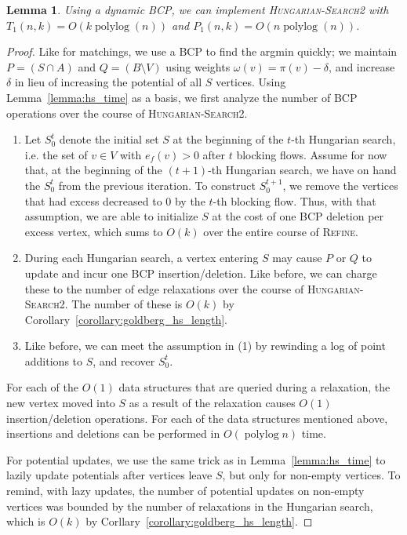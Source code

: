 \documentclass[11pt]{article}
\def\polylog{\mathop{\mathrm{polylog}}}
\theoremstyle{plain}
\newtheorem{lemma}{Lemma}[section]
\numberwithin{figure}{section}
\begin{document}
\begin{lemma}
\label{lemma:goldberg_hs_time}
Using a dynamic BCP, we can implement \textsc{Hungarian-Search2} with
$T_1(n, k) = O(k\polylog(n))$ and $P_1(n, k) = O(n\polylog(n))$.
\end{lemma}

\begin{proof}
Like for matchings, we use a BCP to find the argmin quickly; we maintain
$P = (S \cap A)$ and $Q = (B \setminus V)$ using weights
$\omega(v) = \pi(v) - \delta$, and increase $\delta$ in lieu of increasing the
potential of all $S$ vertices.
Using Lemma~\ref{lemma:hs_time} as a basis, we first analyze the number of BCP
operations over the course of \textsc{Hungarian-Search2}.
\begin{enumerate}
\item Let $S^t_0$ denote the initial set $S$ at the beginning of the
	$t$-th Hungarian search, i.e. the set of $v \in V$ with
	$e_f(v) > 0$ after $t$ blocking flows.
	Assume for now that, at the beginning of the $(t+1)$-th
	Hungarian search, we have on hand the $S^t_0$ from the
	previous iteration.
	To construct $S^{t+1}_0$, we remove the vertices that had
	excess decreased to 0 by the $t$-th blocking flow.
	Thus, with that assumption, we are able to initialize $S$ at
	the cost of one BCP deletion per excess vertex, which sums to
	$O(k)$ over the entire course of \textsc{Refine}.
\item During each Hungarian search, a vertex entering $S$ may cause $P$
	or $Q$ to update and incur one BCP insertion/deletion.
	Like before, we can charge these to the number of edge
	relaxations over the course of \textsc{Hungarian-Search2}.
	The number of these is $O(k)$ by
	Corollary~\ref{corollary:goldberg_hs_length}.
\item Like before, we can meet the assumption in (1) by rewinding a log
	of point additions to $S$, and recover $S^t_0$.
\end{enumerate}

For each of the $O(1)$ data structures that are queried during a relaxation,
the new vertex moved into $S$ as a result of the relaxation causes $O(1)$
insertion/deletion operations.
For each of the data structures mentioned above, insertions and deletions
can be performed in $O(\polylog n)$ time.

For potential updates, we use the same trick as in Lemma~\ref{lemma:hs_time} to
lazily update potentials after vertices leave $S$, but only for non-empty
vertices.
To remind, with lazy updates, the number of potential updates on non-empty
vertices was bounded by the number of relaxations in the Hungarian search,
which is $O(k)$ by Corllary~\ref{corollary:goldberg_hs_length}.


\end{proof}
\end{document}
